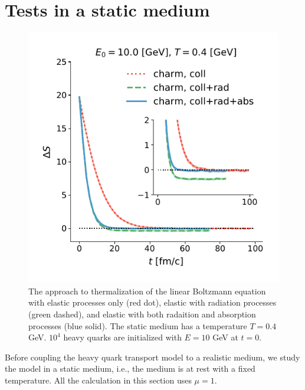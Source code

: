 \documentclass[aps, prc, reprint, amsmath, groupedaddress, nofootinbib]{revtex4-1}
\begin{document}
\section{Tests in a static medium}\label{section:test}
\begin{figure}
\includegraphics[width=\columnwidth]{thermalization.pdf}
\caption{The approach to thermalization of the linear Boltzmann equation with elastic processes only (red dot), elastic with radiation processes (green dashed), and elastic with both radaition and absorption processes (blue solid). The static medium has a temperature $T = 0.4$ GeV. $10^4$ heavy quarks are initialized with $E = 10$ GeV at $t = 0$.}\label{plots:thermalization}
\end{figure}

Before coupling the heavy quark transport model to a realistic medium, we study the model in a static medium, i.e., the medium is at rest with a fixed temperature.
All the calculation in this section uses $\mu =1$.
\end{document}
